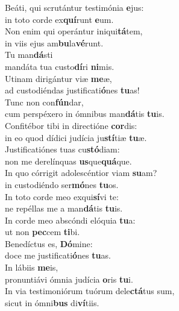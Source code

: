 \evenverse Beáti, qui scrutántur testimónia \textbf{e}jus:~\*\\
\evenverse in toto corde ex\textbf{quí}runt \textbf{e}um.\\
\oddverse Non enim qui operántur iniqui\textbf{tá}tem,~\*\\
\oddverse in viis ejus am\textbf{bu}la\textbf{vé}runt.\\
\evenverse Tu man\textbf{dá}sti~\*\\
\evenverse mandáta tua custo\textbf{dí}ri \textbf{ni}mis.\\
\oddverse Utinam dirigántur viæ \textbf{me}æ,~\*\\
\oddverse ad custodiéndas justificati\textbf{ó}nes \textbf{tu}as!\\
\evenverse Tunc non con\textbf{fún}dar,~\*\\
\evenverse cum perspéxero in ómnibus man\textbf{dá}tis \textbf{tu}is.\\
\oddverse Confitébor tibi in directióne \textbf{cor}dis:~\*\\
\oddverse in eo quod dídici judícia ju\textbf{stí}tiæ \textbf{tu}æ.\\
\evenverse Justificatiónes tuas cu\textbf{stó}diam:~\*\\
\evenverse non me derelínquas \textbf{us}que\textbf{quá}que.\\
\oddverse In quo córrigit adolescéntior viam \textbf{su}am?~\*\\
\oddverse in custodiéndo ser\textbf{mó}nes \textbf{tu}os.\\
\evenverse In toto corde meo exqui\textbf{sí}vi te:~\*\\
\evenverse ne repéllas me a man\textbf{dá}tis \textbf{tu}is.\\
\oddverse In corde meo abscóndi elóquia \textbf{tu}a:~\*\\
\oddverse ut non \textbf{pec}cem \textbf{ti}bi.\\
\evenverse Benedíctus es, \textbf{Dó}mine:~\*\\
\evenverse doce me justificati\textbf{ó}nes \textbf{tu}as.\\
\oddverse In lábiis \textbf{me}is,~\*\\
\oddverse pronuntiávi ómnia judícia \textbf{o}ris \textbf{tu}i.\\
\evenverse In via testimoniórum tuórum dele\textbf{ctá}tus sum,~\*\\
\evenverse sicut in ómni\textbf{bus} di\textbf{ví}tiis.\\
